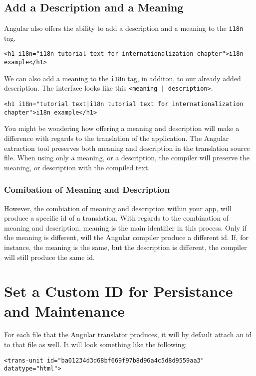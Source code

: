 
\subsection{Add a Description and a Meaning}
Angular also offers the ability to add a description and a meaning to the
\lstinline{i18n} tag. 
\begin{lstlisting}[caption=i18n description]
<h1 i18n="i18n tutorial text for internationalization chapter">i18n example</h1>
\end{lstlisting}

We can also add a meaning to the \lstinline{i18n} tag, in additon, to our 
already added description. The interface looks like this 
\lstinline{<meaning | description>}.

\begin{lstlisting}[caption=i18n \lstinline{<meaning | description>} Example]
<h1 i18n="tutorial text|i18n tutorial text for internationalization chapter">i18n example</h1>
\end{lstlisting}

You might be wondering how offering a meaning and description will make a 
difference with regards to the translation of the application. The Angular 
extraction tool preserves both meaning and description in the translation 
source file. When using only a meaning, or a description, the compiler will
preserve the meaning, or description with the compiled text. 

\subsubsection{Comibation of Meaning and Description}
However, the combiation of meaning and description within your app, will produce 
a specific id of a translation. With regards to the combination of meaning and 
description, meaning is the main identifier in this process. Only if the meaning 
is different, will the Angular compiler produce a different id. If, for instance, 
the meaning is the same, but the description is different, the compiler will 
still produce the same id. 

\section{Set a Custom ID for Persistance and Maintenance}
For each file that the Angular translator produces, it will by default attach 
an id to that file as well. It will look something like the following: 
\begin{lstlisting}[caption=example.fr.xlf.html]
<trans-unit id="ba01234d3d68bf669f97b8d96a4c5d8d9559aa3" datatype="html">
\end{lstlisting}

